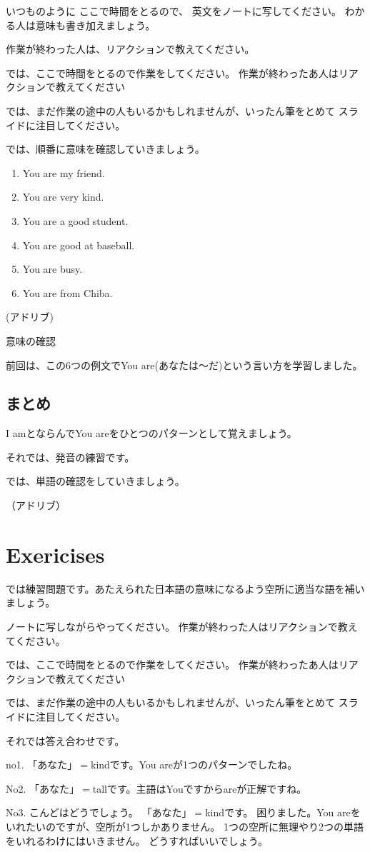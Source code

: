 \documentclass[book,jafontscale=0.9247]{jlreq}
\newcommand{\mySagyo}{%
\par%
\bigskip
では、ここで時間をとるので作業をしてください。
作業が終わったあ人はリアクションで教えてください\par%
\begin{minipage}[t]{.98\textwidth}
\mbox{}\hrulefill\mbox{}\par%
\mbox{}\hfill{}\raisebox{-.5\height}{作業}\hfill\mbox{}\par%
\mbox{}\hrulefill\mbox{}
\end{minipage}%
\par%
\bigskip%
では、まだ作業の途中の人もいるかもしれませんが、いったん筆をとめて
スライドに注目してください。%
\par%
\bigskip
}
\begin{document}
いつものように
ここで時間をとるので、
英文をノートに写してください。
わかる人は意味も書き加えましょう。

作業が終わった人は、リアクションで教えてください。

\mySagyo

では、順番に意味を確認していきましょう。


\begin{enumerate}
 \item You are my friend.
 \item You are very kind.
 \item You are a good student.
 \item You are good at baseball.
 \item You are busy.
 \item You are from Chiba.
\end{enumerate}

(アドリブ)

意味の確認

前回は、この6つの例文でYou are(あなたは〜だ)という言い方を学習しました。


\subsection{まとめ}

I amとならんでYou areをひとつのパターンとして覚えましょう。

それでは、発音の練習です。

では、単語の確認をしていきましょう。

（アドリブ）

\newpage
\section{Exericises}

では練習問題です。あたえられた日本語の意味になるよう空所に適当な語を補いましょう。

ノートに写しながらやってください。
作業が終わった人はリアクションで教えてください。

\mySagyo

それでは答え合わせです。

no1.
「あなた」$=$kindです。You areが1つのパターンでしたね。

No2.
「あなた」$=$tallです。主語はYouですからareが正解ですね。

No3.
こんどはどうでしょう。
「あなた」$=$kindです。
困りました。You areをいれたいのですが、空所が1つしかありません。
1つの空所に無理やり2つの単語をいれるわけにはいきません。
どうすればいいでしょう。
\end{document}
